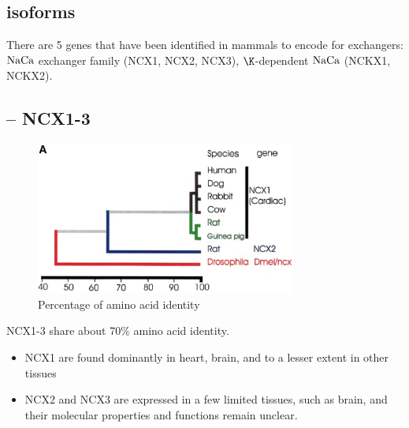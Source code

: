 \subsection{isoforms}
\label{sec:NCX-classification}
\label{sec:NCX-isoforms}

There are 5 genes that have been identified in mammals to encode for
exchangers: ${\text{NaCa}}$ exchanger family (NCX1, NCX2, NCX3), $\K$-dependent ${\text{NaCa}}$
(NCKX1, NCKX2).

\subsection{-- NCX1-3}
\label{sec:NCX-conformation}

\begin{figure}[hbt]
  \centerline{\includegraphics[height=5cm,
    angle=0]{./images/NCX_aa.eps}}
\caption{Percentage of amino acid identity}
\label{fig:NCX_aa}
\end{figure}

NCX1-3 share about 70\% amino acid identity.
\begin{itemize}
  \item NCX1 are found dominantly in heart, brain, and to a lesser extent in
  other tissues
  
  \item NCX2 and NCX3 are expressed in a few limited tissues, such as brain, and
  their molecular properties and functions remain unclear.
  
\end{itemize}



